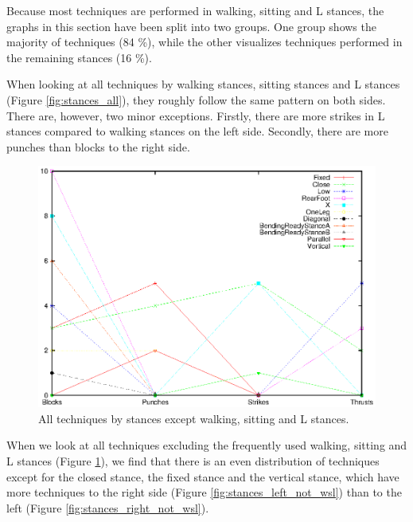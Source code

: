 \documentclass[10pt,twocolumn,a4paper]{article}
\begin{document}
  Because most techniques are performed in walking, sitting and L stances, the
  graphs in this section have been split into two groups. One group shows the
  majority of techniques (84 \%), while the other visualizes techniques
  performed in the remaining stances (16 \%).

  When looking at all techniques by walking stances, sitting stances and L
  stances (Figure \ref{fig:stances_all}), they roughly follow the same pattern
  on both sides. There are, however, two minor exceptions. Firstly, there are
  more strikes in L stances compared to walking stances on the left side.
  Secondly, there are more punches than blocks to the right side.

  \begin{figure}
    \includegraphics[scale=0.65]{data/gnuplot/eps/stances_not_wsl}
    \caption{All techniques by stances except walking, sitting and L stances.}
    \label{fig:stances_not_wsl}
  \end{figure}

  When we look at all techniques excluding the frequently used walking,
  sitting and L stances (Figure \ref{fig:stances_not_wsl}), we find that there
  is an even distribution of techniques except for the closed stance, the
  fixed stance and the vertical stance, which have more techniques to the
  right side (Figure \ref{fig:stances_left_not_wsl}) than to the left (Figure
  \ref{fig:stances_right_not_wsl}).
\end{document}
